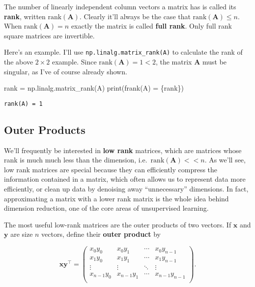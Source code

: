 \documentclass[
  letterpaper,
  DIV=11,
  numbers=noendperiod]{scrreprt}
\newenvironment{Shaded}{\begin{snugshade}}{\end{snugshade}}
\newcommand{\BuiltInTok}[1]{\textcolor[rgb]{0.00,0.23,0.31}{#1}}
\newcommand{\NormalTok}[1]{\textcolor[rgb]{0.00,0.23,0.31}{#1}}
\newcommand{\OperatorTok}[1]{\textcolor[rgb]{0.37,0.37,0.37}{#1}}
\newcommand{\SpecialCharTok}[1]{\textcolor[rgb]{0.37,0.37,0.37}{#1}}
\newcommand{\SpecialStringTok}[1]{\textcolor[rgb]{0.13,0.47,0.30}{#1}}
\begin{document}
The number of linearly independent column vectors a matrix has is called
its \textbf{rank}, written \(\text{rank}(\mathbf{A})\). Clearly it'll
always be the case that \(\text{rank}(\mathbf{A}) \leq n\). When
\(\text{rank}(\mathbf{A}) = n\) exactly the matrix is called
\textbf{full rank}. Only full rank square matrices are invertible.

Here's an example. I'll use \texttt{np.linalg.matrix\_rank(A)} to
calculate the rank of the above \(2 \times 2\) example. Since
\(\text{rank}(\mathbf{A})=1<2\), the matrix \(\mathbf{A}\) must be
singular, as I've of course already shown.

\begin{Shaded}
\begin{Highlighting}[]
\NormalTok{rank }\OperatorTok{=}\NormalTok{ np.linalg.matrix\_rank(A)}
\BuiltInTok{print}\NormalTok{(}\SpecialStringTok{f\textquotesingle{}rank(A) = }\SpecialCharTok{\{}\NormalTok{rank}\SpecialCharTok{\}}\SpecialStringTok{\textquotesingle{}}\NormalTok{)}
\end{Highlighting}
\end{Shaded}

\begin{verbatim}
rank(A) = 1
\end{verbatim}

\hypertarget{outer-products}{%
\subsection{Outer Products}\label{outer-products}}

We'll frequently be interested in \textbf{low rank} matrices, which are
matrices whose rank is much much less than the dimension,
i.e.~\(\text{rank}(\mathbf{A}) << n\). As we'll see, low rank matrices
are special because they can efficiently compress the information
contained in a matrix, which often allows us to represent data more
efficiently, or clean up data by denoising away ``unnecessary''
dimensions. In fact, approximating a matrix with a lower rank matrix is
the whole idea behind dimension reduction, one of the core areas of
unsupervised learning.

The most useful low-rank matrices are the outer products of two vectors.
If \(\mathbf{x}\) and \(\mathbf{y}\) are size \(n\) vectors, define
their \textbf{outer product} by

\[
\mathbf{x} \mathbf{y}^\top = 
\begin{pmatrix}
x_0 y_0 & x_0 y_1 & \cdots & x_0 y_{n-1} \\
x_1 y_0 & x_1 y_1 & \cdots & x_1 y_{n-1} \\
\vdots & \vdots & \ddots & \vdots \\
x_{n-1} y_0 & x_{n-1} y_1 & \cdots & x_{n-1} y_{n-1} \\
\end{pmatrix}.
\]
\end{document}
